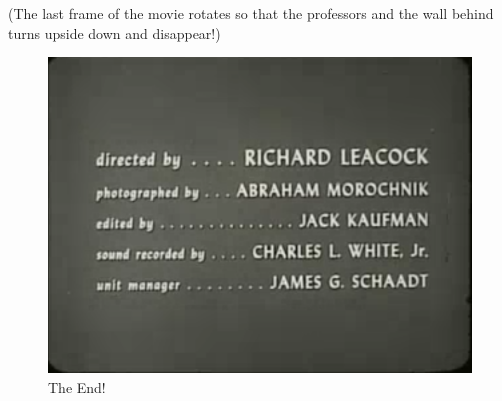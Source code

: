 \documentclass[a6paper]{article}
\begin{document}
(The last frame of the movie rotates so that the professors and the wall behind turns upside down and disappear!)
        \begin{figure}[h!]
            \centering
            \includegraphics[width=1\linewidth]{the-end.png}
            \caption{The End!}
            \label{fig: the-end}
        \end{figure}
\end{document}
